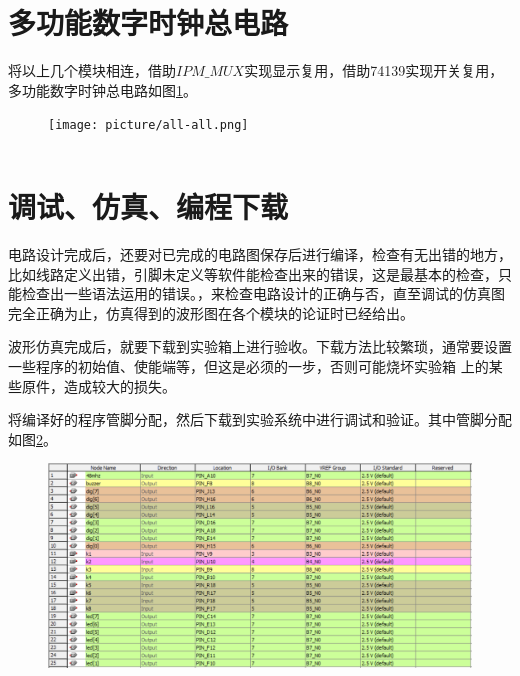\documentclass[12pt]{article}
\begin{document}
\section{多功能数字时钟总电路}
将以上几个模块相连，借助$IPM\_MUX$实现显示复用，借助74139实现开关复用，多功能数字时钟总电路如图\ref{fig:all-2}。
\begin{figure}[hp]
	\centering  
	\texttt{[image: picture/all-all.png]} 
	\caption{}
	\label{fig:all-2}   
\end{figure}
\begin{lstlisting}[language=VHDL]
\end{lstlisting}
\section{调试、仿真、编程下载}
电路设计完成后，还要对已完成的电路图保存后进行编译，检查有无出错的地方，比如线路定义出错，引脚未定义等软件能检查出来的错误，这是最基本的检查，只能检查出一些语法运用的错误。，来检查电路设计的正确与否，直至调试的仿真图完全正确为止，仿真得到的波形图在各个模块的论证时已经给出。 \par
波形仿真完成后，就要下载到实验箱上进行验收。下载方法比较繁琐，通常要设置一些程序的初始值、使能端等，但这是必须的一步，否则可能烧坏实验箱
上的某些原件，造成较大的损失。\par

将编译好的程序管脚分配，然后下载到实验系统中进行调试和验证。其中管脚分配如图\ref{fig:pins}。
\begin{figure}[hp]
	\centering  
	\includegraphics[width=\textwidth]{picture/pins.png} 
	\caption{}
	\label{fig:pins}   
\end{figure}
\end{document}
